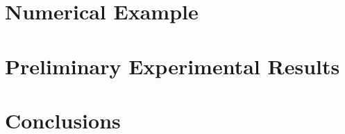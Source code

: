 \documentclass[letterpaper, 10pt, conference]{ieeeconf}
\begin{document}


	
\section{Numerical Example}
\label{sec:NumRes}


\section{Preliminary Experimental Results}
\label{sec:ExpRes}

\section{Conclusions}


	


\end{document}
